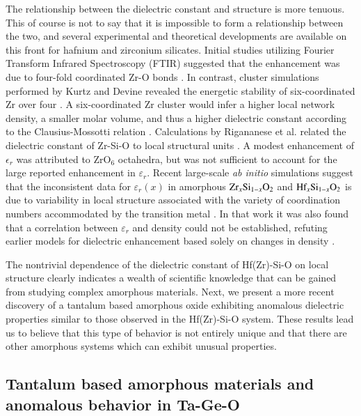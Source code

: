 The relationship between the dielectric constant and structure is more tenuous. This of course is not to say that it is impossible to form a relationship between the two, and several experimental and theoretical developments are available on this front for hafnium and zirconium silicates. Initial studies utilizing Fourier Transform Infrared Spectroscopy (FTIR) suggested that the enhancement was due to four-fold coordinated Zr-O bonds \cite{Lucovsky2000}. In contrast, cluster simulations performed by Kurtz and Devine revealed the energetic stability of six-coordinated Zr over four \cite{Kurtz2001}. A six-coordinated Zr cluster would infer a higher local network density, a smaller molar volume, and thus a higher dielectric constant according to the Clausius-Mossotti relation \cite{Kurtz2001}. Calculations by Rigananese et al. related the dielectric constant of Zr-Si-O to local structural units \cite{Rignanese2002}. A modest enhancement of $\epsilon_{r}$ was attributed to ZrO$_{6}$ octahedra, but was not sufficient to account for the large reported enhancement in $\varepsilon_{r}$. Recent large-scale \textit{ab initio} simulations suggest that the inconsistent data for $\varepsilon_{r} (x)$ in amorphous $\textnormal{Zr}_{x}\textnormal{Si}_{1-x}\textnormal{O}_{2}$ and $\textnormal{Hf}_{x}\textnormal{Si}_{1-x}\textnormal{O}_{2}$ is due to variability in local structure associated with the variety of coordination numbers accommodated by the transition metal \cite{Pignedoli2007}.  In that work it was also found that a correlation between $\varepsilon_{r}$ and density could not be established, refuting earlier models for dielectric enhancement based solely on changes in density \cite{Kurtz2001,Devine2001}.

The nontrivial dependence of the dielectric constant of Hf(Zr)-Si-O on local structure clearly indicates a wealth of scientific knowledge that can be gained from studying complex amorphous materials. Next, we present a more recent discovery of a tantalum based amorphous oxide exhibiting anomalous dielectric properties similar to those observed in the Hf(Zr)-Si-O system. These results lead us to believe that this type of behavior is not entirely unique and that there are other amorphous systems which can exhibit unusual properties.

\subsection{Tantalum based amorphous materials and anomalous behavior in Ta-Ge-O}

